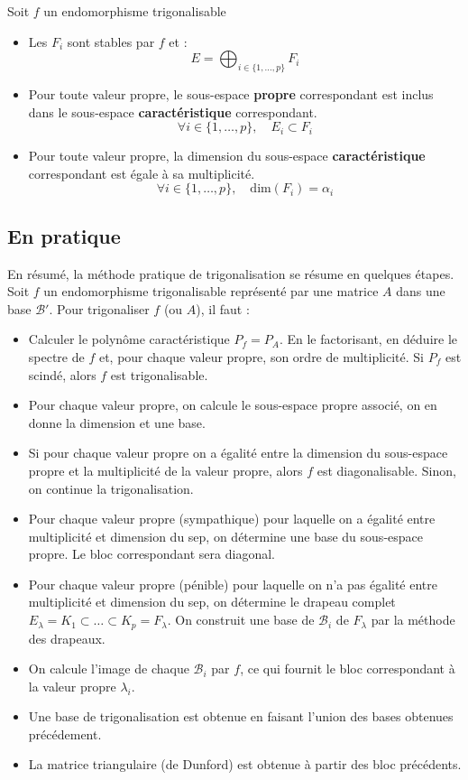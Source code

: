 \begin{theorem}
    Soit $f$ un endomorphisme trigonalisable
    \begin{itemize}
        \item Les $F_i$ sont stables par $f$ et :
            \[ E = \bigoplus_{i \in \{1,\dots,p\}} F_i \]
        \item Pour toute valeur propre, le sous-espace \textbf{propre} correspondant est inclus dans le sous-espace 
        \textbf{caractéristique} correspondant. 
            \[ \forall i \in \{1,\dots,p\}, \quad E_i \subset F_i \] 
        \item Pour toute valeur propre, la dimension du sous-espace \textbf{caractéristique} correspondant est égale à sa multiplicité. 
            \[ \forall i \in \{1,\dots,p\}, \quad \text{dim}(F_i) = \alpha_i \]
    \end{itemize}
\end{theorem}


\subsection{En pratique}

En résumé, la méthode pratique de trigonalisation se résume en quelques étapes. 
Soit $f$ un endomorphisme trigonalisable représenté par une matrice $A$ dans une base $\mathcal{B}'$. 
Pour trigonaliser $f$ (ou $A$), il faut :
\begin{itemize}
    \item Calculer le polynôme caractéristique $P_f = P_A$. 
    En le factorisant, en déduire le spectre de $f$ et, pour chaque valeur propre, son ordre de multiplicité. 
    Si $P_f$ est scindé, alors $f$ est trigonalisable. 
    \item Pour chaque valeur propre, on calcule le sous-espace propre associé, on en donne la dimension et une base. 
    \item Si pour chaque valeur propre on a égalité entre la dimension du sous-espace propre et la multiplicité de la valeur 
    propre, alors $f$ est diagonalisable. Sinon, on continue la trigonalisation. 
    \item Pour chaque valeur propre (sympathique) pour laquelle on a égalité entre multiplicité et dimension du sep,
    on détermine une base du sous-espace propre. Le bloc correspondant sera diagonal.
    \item Pour chaque valeur propre (pénible) pour laquelle on n’a pas égalité entre multiplicité et dimension du sep,
    on détermine le drapeau complet $E_\lambda = K_1 \subset \dots \subset K_p = F_\lambda$.
    On construit une base de $\mathcal{B}_i$ de $F_\lambda$ par la méthode des drapeaux.
    \item On calcule l'image de chaque $\mathcal{B}_i$ par $f$, ce qui fournit le bloc correspondant à la valeur propre $\lambda_i$. 
    \item Une base de trigonalisation est obtenue en faisant l'union des bases obtenues précédement. 
    \item La matrice triangulaire (de Dunford) est obtenue à partir des bloc précédents. 
\end{itemize}


